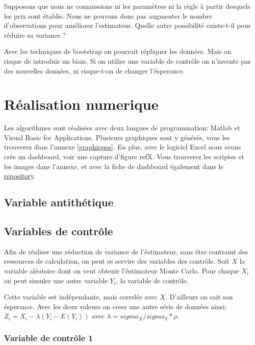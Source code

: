 \documentclass[a4paper,12pt]{scrartcl}
\begin{document}
Supposons que nous ne connaissions ni les paramètres ni la règle à partir desquels les prix sont établis. 
Nous ne pouvons donc pas augmenter le nombre d'observations pour améliorer l'estimateur.
Quelle autre possibilité existe-t-il pour réduire sa variance ?

Avec les techniques de bootstrap on pourrait répliquer les données. 
Mais on risque de introduir un biais.
Si on utilise une variable de contrôle on n'invente pas des nouvelles données, ni risque-t-on de changer l'ésperance.


\section{Réalisation numerique}

Les algorithmes sont réalisées avec deux langues de programmation: Matlab et Visual Basic for Applications.
Plusieurs graphiques sont y générés, vous les trouverez dans l'annexe \ref{graphiques}.
En plus, avec le logiciel Excel nous avons crée un dashboard, voir une capture d'figure ref{X}. 
Vous trouverez les scriptes et les images dans l'annexe, et avec la fiche de dashboard également dans le \href{https://github.com/matthias-10/UCO_actuariat_mini-projet}{repository}.


\subsection{Variable antithétique}
\subsection{Variables de contrôle}

Afin de réaliser une réduction de variance de l'éstimateur, sans être contraint des ressources de calculation, on peut se servire des variables des contrôle.
Soit $X$ la variable aléatoire dont on veut obtenir l'éstimateur Monte Carlo.
Pour chaque $X_i$ on peut simuler une autre variable $Y_i$, la variable de contrôle.

Cette variable est indépendante, mais correlée avec $X$.
D'ailleurs on sait son ésperance.
Avec les deux valeurs on creer une autre série de données ainsi:
$Z_i = X_i - \lambda(Y_i - E(Y_i))$ avec $\lambda = sigma_X/sigma_Y * \rho$.

\subsubsection{Variable de contrôle 1}
\end{document}
